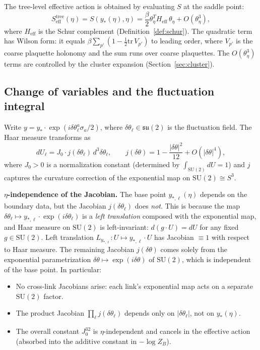 \documentclass[11pt]{article}
\theoremstyle{definition}
\newcommand{\SU}{\mathrm{SU}}
\newcommand{\su}{\mathfrak{su}}
\newcommand{\tr}{\mathrm{tr}}
\begin{document}
The tree-level effective action is obtained by evaluating $S$ at the
saddle point:
\begin{equation}\label{eq:tree}
S_{\mathrm{eff}}^{\mathrm{tree}}(\eta)
=S(y_*(\eta),\eta)
=\frac{\beta}{2}\theta_\eta^T H_{\mathrm{eff}}\,\theta_\eta
+O(\theta_\eta^3),
\end{equation}
where $H_{\mathrm{eff}}$ is the Schur complement
(Definition~\ref{def:schur}).  The quadratic term has Wilson form:
it equals $\beta\sum_{p'}(1-\frac{1}{2}\tr\,V_{p'})$ to leading
order, where $V_{p'}$ is the coarse plaquette holonomy and the sum
runs over coarse plaquettes.  The $O(\theta_\eta^3)$ terms are
controlled by the cluster expansion (Section~\ref{sec:cluster}).

\subsection{Change of variables and the fluctuation integral}
\label{subsec:fluctuation}

Write $y=y_*\cdot\exp(i\delta\theta^a_\ell\sigma_a/2)$, where
$\delta\theta_\ell\in\su(2)$ is the fluctuation field.  The Haar
measure transforms as
\begin{equation}
dU_\ell=J_0\cdot j(\delta\theta_\ell)\,d^3\delta\theta_\ell,
\qquad j(\delta\theta)=1-\frac{|\delta\theta|^2}{12}+O(|\delta\theta|^4),
\end{equation}
where $J_0>0$ is a normalization constant (determined by
$\int_{\SU(2)}dU=1$) and $j$ captures the curvature correction of
the exponential map on $\SU(2)\cong S^3$.

\textbf{$\eta$-independence of the Jacobian.}
The base point $y_{*,\ell}(\eta)$ depends on the boundary data,
but the Jacobian $j(\delta\theta_\ell)$ does \emph{not}.
This is because the map $\delta\theta_\ell\mapsto
y_{*,\ell}\cdot\exp(i\delta\theta_\ell)$ is a \emph{left
translation} composed with the exponential map, and Haar measure
on $\SU(2)$ is left-invariant:
$d(g\cdot U)=dU$ for any fixed $g\in\SU(2)$.
Left translation $L_{y_{*,\ell}}:U\mapsto y_{*,\ell}\cdot U$
has Jacobian $\equiv 1$ with respect to Haar measure.
The remaining Jacobian $j(\delta\theta)$ comes solely from
the exponential parametrization $\delta\theta\mapsto
\exp(i\delta\theta)$ of $\SU(2)$, which is independent of the
base point.  In particular:
\begin{itemize}[nosep]
\item No cross-link Jacobians arise: each link's exponential
map acts on a separate $\SU(2)$ factor.
\item The product Jacobian $\prod_\ell j(\delta\theta_\ell)$
depends only on $|\delta\theta_\ell|$, not on $y_*(\eta)$.
\item The overall constant $J_0^{32}$
is $\eta$-independent and cancels in the effective action (absorbed
into the additive constant in $-\log Z_B$).
\end{itemize}
\end{document}
